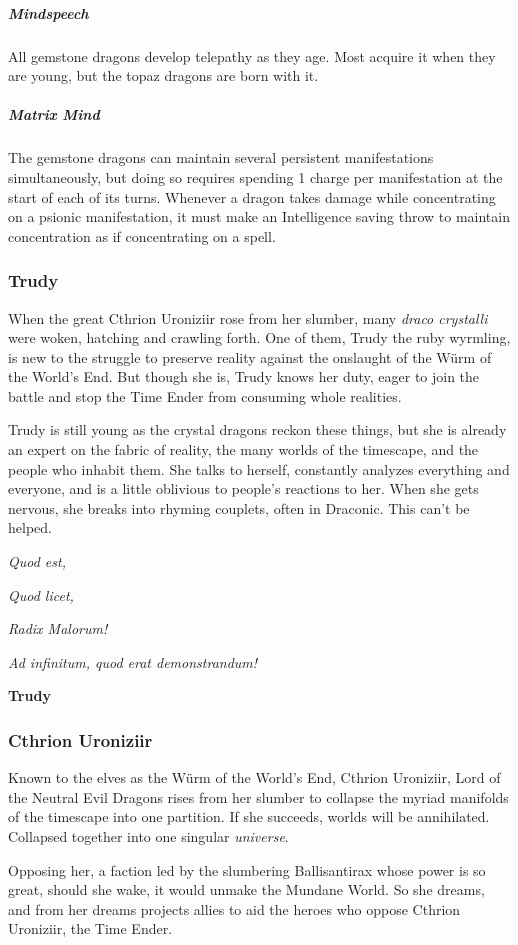\documentclass[10pt,a4paper,twoside,bg=print,twocolumn,openany,nodeprecatedcode]{dndbook}
\begin{document}
\subparagraph{Mindspeech}
All gemstone dragons develop telepathy as they age. Most acquire it when they are young, but the topaz dragons are born with it.

\subparagraph{Matrix Mind}
The gemstone dragons can maintain several persistent manifestations simultaneously, but doing so requires spending 1 charge per manifestation at the start of each of its turns. Whenever a dragon takes damage while concentrating on a psionic manifestation, it must make an Intelligence saving throw to maintain concentration as if concentrating on a spell.

\subsubsection{Trudy}
When the great Cthrion Uroniziir rose from her slumber, many \textit{draco crystalli} were woken, hatching and crawling forth. One of them, Trudy the ruby wyrmling, is new to the struggle to preserve reality against the onslaught of the Würm of the World's End. But though she is, Trudy knows her duty, eager to join the battle and stop the Time Ender from consuming whole realities.

Trudy is still young as the crystal dragons reckon these things, but she is already an expert on the fabric of reality, the many worlds of the timescape, and the people who inhabit them. She talks to herself, constantly analyzes everything and everyone, and is a little oblivious to people's reactions to her. When she gets nervous, she breaks into rhyming couplets, often in Draconic. This can't be helped.

\textit{Quod est,}

\textit{Quod licet,}

\textit{Radix Malorum!}

\textit{Ad infinitum, quod erat demonstrandum!}

\textbf{Trudy}

\subsubsection{Cthrion Uroniziir}
Known to the elves as the Würm of the World's End, Cthrion Uroniziir, Lord of the Neutral Evil Dragons rises from her slumber to collapse the myriad manifolds of the timescape into one partition. If she succeeds, worlds will be annihilated. Collapsed together into one singular \textit{universe}.

Opposing her, a faction led by the slumbering Ballisantirax whose power is so great, should she wake, it would unmake the Mundane World. So she dreams, and from her dreams projects allies to aid the heroes who oppose Cthrion Uroniziir, the Time Ender.
\end{document}
